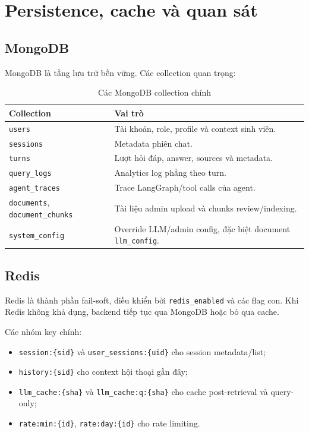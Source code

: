 \documentclass[../DoAn.tex]{subfiles}
\begin{document}
\section{Persistence, cache và quan sát}

\subsection{MongoDB}

MongoDB là tầng lưu trữ bền vững. Các collection quan trọng:

\begin{table}[h]
\centering
\begin{tabular}{|l|p{9.0cm}|}
\hline
\textbf{Collection} & \textbf{Vai trò} \\
\hline
\texttt{users} & Tài khoản, role, profile và context sinh viên. \\
\hline
\texttt{sessions} & Metadata phiên chat. \\
\hline
\texttt{turns} & Lượt hỏi đáp, answer, sources và metadata. \\
\hline
\texttt{query\_logs} & Analytics log phẳng theo turn. \\
\hline
\texttt{agent\_traces} & Trace LangGraph/tool calls của agent. \\
\hline
\texttt{documents}, \texttt{document\_chunks} & Tài liệu admin upload và chunks
review/indexing. \\
\hline
\texttt{system\_config} & Override LLM/admin config, đặc biệt document
\texttt{llm\_config}. \\
\hline
\end{tabular}
\caption{Các MongoDB collection chính}
\end{table}

\subsection{Redis}

Redis là thành phần fail-soft, điều khiển bởi \texttt{redis\_enabled} và các flag
con. Khi Redis không khả dụng, backend tiếp tục qua MongoDB hoặc bỏ qua cache.

Các nhóm key chính:

\begin{itemize}
    \item \texttt{session:\{sid\}} và \texttt{user\_sessions:\{uid\}} cho session
    metadata/list;
    \item \texttt{history:\{sid\}} cho context hội thoại gần đây;
    \item \texttt{llm\_cache:\{sha\}} và \texttt{llm\_cache:q:\{sha\}} cho cache
    post-retrieval và query-only;
    \item \texttt{rate:min:\{id\}}, \texttt{rate:day:\{id\}} cho rate limiting.
\end{itemize}
\end{document}

